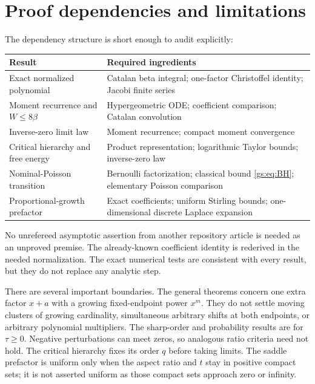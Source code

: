 \documentclass[11pt,a4paper]{article}
\numberwithin{equation}{section}
\theoremstyle{definition}
\theoremstyle{remark}
\begin{document}

\section{Proof dependencies and limitations}
\label{gs:sec:scope}

The dependency structure is short enough to audit explicitly:
\begin{center}
\begin{tabular}{@{}>{\raggedright\arraybackslash}p{.44\linewidth}
 >{\raggedright\arraybackslash}p{.48\linewidth}@{}}
\toprule
Result & Required ingredients\\
\midrule
Exact normalized polynomial & Catalan beta integral; one-factor
Christoffel identity; Jacobi finite series\\
Moment recurrence and $W\le8\beta$ & Hypergeometric ODE; coefficient
comparison; Catalan convolution\\
Inverse-zero limit law & Moment recurrence; compact moment convergence\\
Critical hierarchy and free energy & Product representation;
logarithmic Taylor bounds; inverse-zero law\\
Nominal-Poisson transition & Bernoulli factorization; classical
bound \eqref{gs:eq:BH}; elementary Poisson comparison\\
Proportional-growth prefactor & Exact coefficients; uniform Stirling
bounds; one-dimensional discrete Laplace expansion\\
\bottomrule
\end{tabular}
\end{center}
No unrefereed asymptotic assertion from another repository article is
needed as an unproved premise. The already-known coefficient identity is
rederived in the needed normalization. The exact numerical tests are
consistent with every result, but they do not replace any analytic step.

There are several important boundaries. The general theorems concern
one extra factor $x+a$ with a growing fixed-endpoint power $x^m$.
They do not settle moving clusters of growing cardinality, simultaneous
arbitrary shifts at both endpoints, or arbitrary polynomial multipliers.
The sharp-order and probability results are for $\tau\ge0$. Negative
perturbations can meet zeros, so analogous ratio criteria need not hold.
The critical hierarchy fixes its order $q$ before taking limits.
The saddle prefactor is uniform only when the aspect ratio and $t$ stay
in positive compact sets; it is not asserted uniform as those compact
sets approach zero or infinity.
\end{document}
